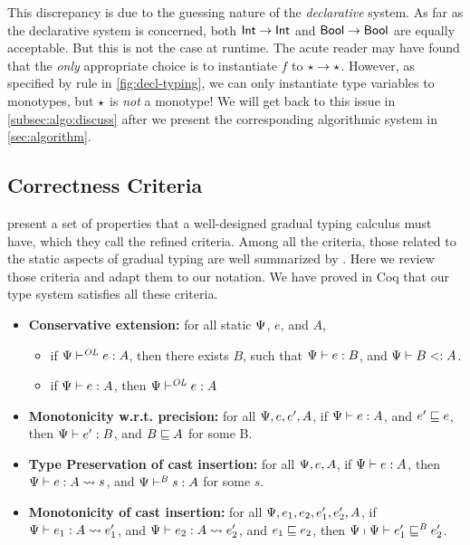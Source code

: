 This discrepancy is due to the guessing nature of the \textit{declarative}
system. As far as the declarative system is concerned, both $\mathsf{Int} \to \mathsf{Int}$ and
$\mathsf{Bool} \to \mathsf{Bool}$ are equally acceptable. But this is not the case at runtime.
The acute reader may have found that the \textit{only} appropriate choice is to
instantiate $f$ to $\star \to \star$. However, as specified by rule
 in \cref{fig:decl-typing}, we can only instantiate type variables
to monotypes, but $\star$ is \textit{not} a monotype! We will get back to
this issue in \cref{subsec:algo:discuss} after we present the corresponding
algorithmic system in \cref{sec:algorithm}.


\subsection{Correctness Criteria}
\label{sec:criteria}

\citet{siek2015refined} present a set of properties that a well-designed gradual
typing calculus must have, which they call the refined criteria. Among all the
criteria, those related to the static aspects of gradual typing are well
summarized by \citet{cimini2016gradualizer}. Here we review those criteria and
adapt them to our notation. We have proved in Coq that our type system satisfies
all these criteria.

\begin{clemma}\leavevmode
  \begin{itemize}
  \item \textbf{Conservative extension:}
    for all static $\Psi$, $e$, and $A$,
    \begin{itemize}
    \item if $\Psi \vdash^{\mathit{OL}} e : A $,
      then there exists $B$,
      such that $\Psi \vdash e : B$,
      and $\Psi {} \vdash B <: A$.
    \item if $\Psi \vdash e : A$,
      then $\Psi \vdash^{\mathit{OL}} e : A $
    \end{itemize}
  \item \textbf{Monotonicity w.r.t. precision:}
    for all $\Psi, e, e', A$,
    if $\Psi \vdash e : A$,
    and $e' \sqsubseteq e$,
    then $\Psi \vdash e' : B$,
    and $B \sqsubseteq A$ for some B.
  \item \textbf{Type Preservation of cast insertion:}
    for all $\Psi, e, A$,
    if $\Psi \vdash e : A$,
    then $\Psi \vdash e : A \rightsquigarrow{s}$,
    and $\Psi \vdash^{\mathit{B}} s : A$ for some $s$.
  \item \textbf{Monotonicity of cast insertion:}
    for all $\Psi, e_1, e_2, e_1', e_2', A$,
    if $\Psi \vdash e_1 : A \rightsquigarrow{e}_1'$,
    and $\Psi \vdash e_2 : A \rightsquigarrow{e}_2'$,
    and $e_1 \sqsubseteq e_2$,
    then $\Psi \shortmid \Psi \vdash e_1' \sqsubseteq^{\mathit{B}} e_2'$.
  \end{itemize}
\end{clemma}


